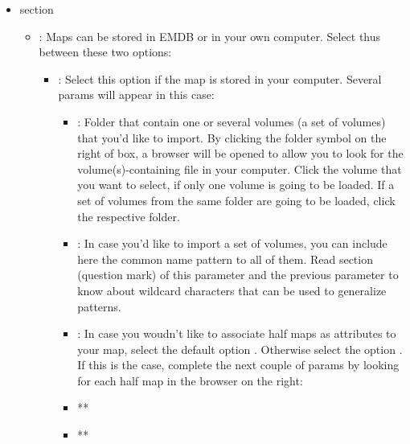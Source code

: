 \begin{itemize}
   \item {} section
  

        \begin{itemize}
        \item {}: Maps can be stored in EMDB or in your own computer. Select thus between these two options:
                    \begin{itemize}
                    \item {}: Select this option if the map is stored in your computer. Several params will appear in this case:\\
                                \begin{itemize}
                                \item {}: Folder that contain one or several volumes (a set of volumes) that you'd like to import. By clicking the folder symbol on the right of  box, a browser will be opened to allow you to look for the volume(s)-containing file in your computer. Click the volume that you want to select, if only one volume is going to be loaded. If a set of volumes from the same folder are going to be loaded, click the respective folder.
                                \item {}: In case you'd like to import a set of volumes, you can include here the common name pattern to all of them. Read  section (question mark) of this parameter and the previous parameter  to know about wildcard characters that can be used to generalize patterns.
                                \item {}: In case you woudn't like to associate half maps as attributes to your map, select the default option . Otherwise select the option . If this is the case, complete the next couple of params by looking for each half map in the browser on the right:
                                    
                                    \item ** 
                                    \item ** 
                                    

\end{itemize}
\end{itemize}
\end{itemize}
\end{itemize}
